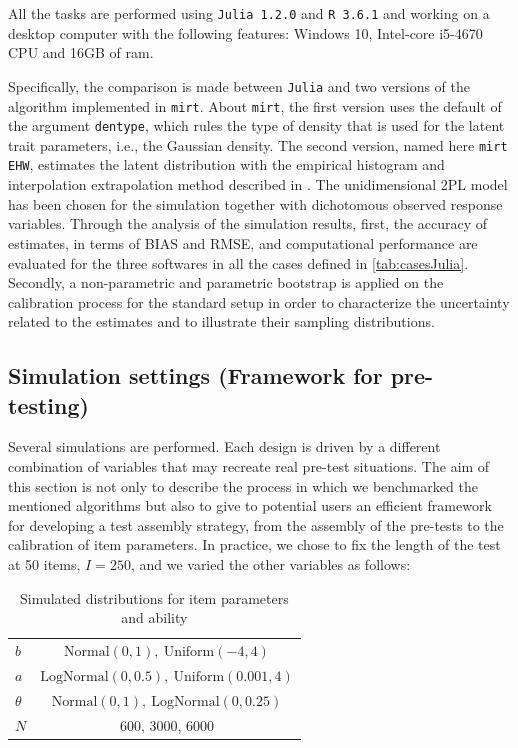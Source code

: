 All the tasks are performed using \texttt{Julia 1.2.0} and \texttt{R 3.6.1} and working on a desktop computer with the following features: Windows 10, Intel-core i5-4670 CPU and 16GB of ram.

Specifically, the comparison is made between \texttt{Julia} and two versions of the algorithm implemented in \texttt{mirt}. About \texttt{mirt}, the first version uses the default of the argument \texttt{dentype}, which rules the type of density that is used for the latent trait parameters, i.e., the Gaussian density. The second version, named here \texttt{mirt EHW},  estimates the latent distribution with the empirical histogram and interpolation extrapolation method described in \textcite{woods2007}. The unidimensional 2PL model has been chosen for the simulation together with dichotomous observed response variables.
Through the analysis of the simulation results, first, the accuracy of estimates, in terms of BIAS and RMSE, and computational performance are evaluated for the three softwares in all the cases defined in \ref{tab:casesJulia}. Secondly, a non-parametric and parametric bootstrap is applied on the calibration process for the standard setup in order to characterize the uncertainty related to the estimates and to illustrate their sampling distributions.

\subsection{Simulation settings (Framework for pre-testing)} \label{sec:Julia:simSet}
\label{sec:sim_catbs}
Several simulations are performed. Each design is driven by a different combination of variables that may recreate real pre-test situations. The aim of this section is not only to describe the process in which we benchmarked the mentioned algorithms but also to give to potential users an efficient framework for developing a test assembly strategy, from the assembly of the pre-tests to the calibration of item parameters. 
In practice, we chose to fix the length of the test at 50 items, $I=250$, and we varied the other variables as follows:
	\renewcommand{\arraystretch}{1.3}%
\begin{table}[ht]
\centering
\caption{Simulated  distributions for item parameters and \hspace{10pt}  ability \label{tab:combJulia}}
	\begin{tabular}{ l  c }
		\toprule
		$b$         & $  \text{Normal}(0,1), \ \text{Uniform}(-4,4)  $ \\%
		$a$         & $  \text{LogNormal}(0,0.5), \ \text{Uniform}(0.001,4) $ \\%
		$\theta$    & $\text{Normal}(0,1), \ \text{LogNormal}(0,0.25)$ \\%
		$N$                             & 600, 3000, 6000 \\%
		\bottomrule  
	\end{tabular}
\end{table}

